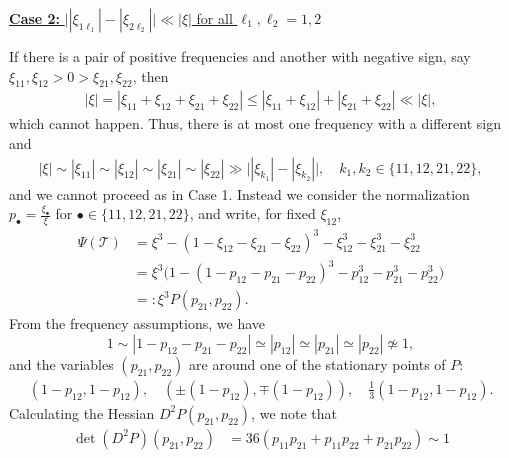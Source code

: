 \documentclass[%
11pt,  reqno]{amsart}
\newcommand{\5}{\textup{V}}
\newcommand{\noi}{\noindent}
\newcommand{\wt}{\widetilde}
\theoremstyle{remark}
\newcommand{\bul}{\bullet}
\newcommand{\TT}{\mathcal{T}}
\renewcommand{\l}{\ell}
\newcommand{\ges}{\gtrsim}
\numberwithin{equation}{section}
\numberwithin{theorem}{section}
\begin{document}

    
    


\smallskip
\noi
\underline{\textbf{Case 2:} $ \big| |\xi_{1\l_1}| - |\xi_{2\l_2}| \big|\ll |\xi| $ for all $\l_1,\l_2=1,2$}

If there is a pair of positive frequencies and another with negative sign, say $\xi_{11},\xi_{12}>0>\xi_{21}, \xi_{22}$, then
\begin{align}
    |\xi| = |\xi_{11} + \xi_{12} + \xi_{21} + \xi_{22} | 
    \le |\xi_{11} + \xi_{12}| + |\xi_{21} + \xi_{22}| \ll |\xi|, 
\end{align}
which cannot happen. Thus, there is at most one frequency with a different sign and 
\begin{align}
   |\xi|\sim |\xi_{11}| \sim |\xi_{12}| \sim |\xi_{21}| \sim |\xi_{22}| \gg 
    \big| |\xi_{k_1}| - |\xi_{k_2}| \big|, \quad k_1,k_2 \in \{11,12,21,22\}, 
\end{align}
and we cannot proceed as in Case 1. Instead we consider the normalization $p_\bul = \frac{\xi_\bul}{\xi}$ for $\bul\in\{11, 12, 21, 22\}$, and write, for fixed $\xi_{12}$, 
\begin{align}
    \Psi(\TT) 
    &
    = \xi^3 - (1-\xi_{12} - \xi_{21} - \xi_{22})^3 - \xi_{12}^3 - \xi_{21}^3 - \xi_{22}^3 
    \\
    &
    =
    \xi^3 \big( 1 - (1-p_{12} - p_{21}-p_{22})^3 - p_{12}^3 - p_{21}^3 - p_{22}^3 \big)
    \\
    & = : \xi^3 P(p_{21}, p_{22} ).
\end{align}
From the frequency assumptions, we have 
$$1\sim |1 - p_{12}-p_{21} - p_{22}| \simeq |p_{12}| \simeq |p_{21} |\simeq |p_{22}|\not\simeq 1,$$
and the variables $(p_{21}, p_{22})$ are around one of the stationary points of $P$:
\begin{align}\label{crit}
    (1-p_{12}, 1-p_{12}), \quad (\pm(1-p_{12}), \mp(1-p_{12})), \quad \tfrac13(1-p_{12}, 1-p_{12}). 
\end{align}
Calculating the Hessian $D^2 P(p_{21}, p_{22})$, we note that 
\begin{align}
 \det(D^2 P)(p_{21}, p_{22}) 
 &
 = 36 (p_{11} p_{21} + p_{11} p_{22} + p_{21} p_{22} ) \sim 1
\end{align}
\end{document}
